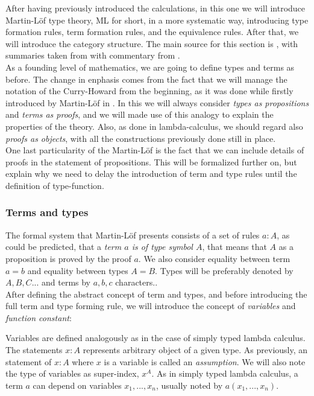 After having previously introduced the calculations, in this one we will introduce Martin-L\"of type theory, ML for short, in a more systematic way, introducing type formation rules, term formation rules, and the equivalence rules. After that, we will introduce the category structure. The main source for this section is \cite{martinlof1973intuitionistic}, with summaries taken from \cite{seely1984locally} with commentary from .\\

As a founding level of mathematics, we are going to define types and terms as before. The change in enphasis comes from the fact that we will manage the notation of the Curry-Howard from the beginning, as it was done while firstly introduced by Martin-L\"of in \cite{martinlof1973intuitionistic}. In this we will always consider \emph{types as propositions} and \emph{terms as proofs}, and we will made use of this analogy to explain the properties of the theory. Also, as done in lambda-calculus, we should regard also \emph{proofs as objects}, with all the constructions previously done still in place.\\

One last particularity of the Martin-L\"of is the fact that we can include details of proofs in the statement of propositions. This will be formalized further on, but explain why we need to delay the introduction of term and type rules until the definition of type-function.

\subsubsection{Terms and types}

The formal system that Martin-L\"of presents consists of a set of rules $a : A$, as could be predicted, that a \emph{term $a$ is of type symbol $A$}, that means that $A$ as a proposition is proved by the proof $a$. We also consider equality between term $a = b$ and equality between types $A = B$. Types will be preferably denoted by $A,B,C...$ and terms by $a,b,c$ characters..\\

After defining the abstract concept of term and types, and before introducing the full term and type forming rule, we will introduce the concept of \emph{variables} and \emph{function constant}:

Variables are defined analogously as in the case of simply typed lambda calculus. The statements $x: A$ represents arbitrary object of a given type. As previously, an statement of $x: A$ where $x$ is a variable is called an \emph{assumption}. We will also note the type of variables as super-index, $x^A$. As in simply typed lambda calculus, a term $a$ can depend on variables $x_1,...,x_n$, usually noted by $a(x_1,...,x_n)$.\\

